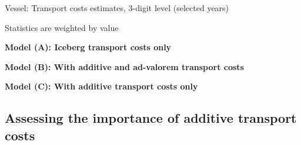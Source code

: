 \documentclass[a4paper,11pt]{article}
\begin{document}
\begin{table}[htbp]
	\centering
	\footnotesize{
		\caption{Vessel: Transport costs estimates, 3-digit level (selected years)}\vspace{5mm}
		\label{tab:result_ves_3d_detail}%
		
		\begin{tablenotes}
			\tiny
		\item Statistics are weighted by value
		\item \textbf{Model (A): Iceberg transport costs only}
		\item \textbf{Model (B): With additive and ad-valorem transport costs}
		\item \textbf{Model (C): With additive transport costs only}
		\end{tablenotes}
   }
\end{table}%


\subsection{Assessing the importance of additive transport costs \label{app:diagnostic_test}}
\end{document}
